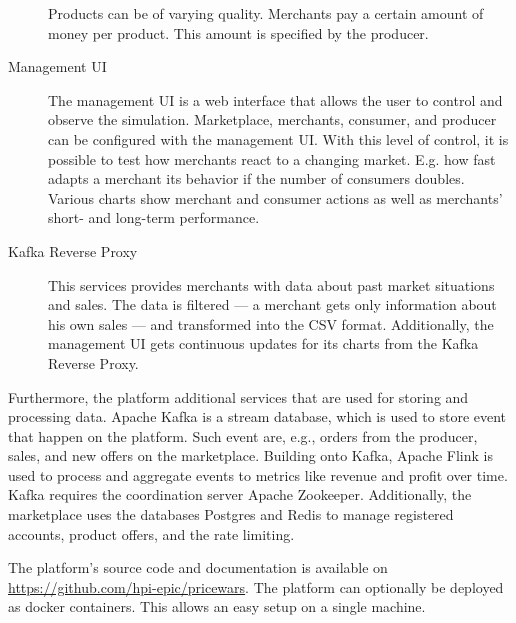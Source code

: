 \begin{description}
		Products can be of varying quality.
		Merchants pay a certain amount of money per product.
		This amount is specified by the producer.
	\item [Management UI]
		The management UI is a web interface that allows the user to control and observe the simulation.
		Marketplace, merchants, consumer, and producer can be configured with the management UI.
		With this level of control, it is possible to test how merchants react to a changing market. E.g. how fast adapts a merchant its behavior if the number of consumers doubles.
		Various charts show merchant and consumer actions as well as merchants' short- and long-term performance.
	\item [Kafka Reverse Proxy]
		This services provides merchants with data about past market situations and sales.
		The data is filtered --- a merchant gets only information about his own sales --- and transformed into the CSV format.
		Additionally, the management UI gets continuous updates for its charts from the Kafka Reverse Proxy.
		
\end{description}

Furthermore, the \pricewars platform additional services that are used for storing and processing data.
Apache Kafka is a stream database, which is used to store event that happen on the platform. Such event are, e.g., orders from the producer, sales, and new offers on the marketplace.
Building onto Kafka, Apache Flink is used to process and aggregate events to metrics like revenue and profit over time.
Kafka requires the coordination server Apache Zookeeper.
Additionally, the marketplace uses the databases Postgres and Redis to manage registered accounts, product offers, and the rate limiting.

The platform's source code and documentation is available on \url{https://github.com/hpi-epic/pricewars}.
The \pricewars platform can optionally be deployed as docker containers.
This allows an easy setup on a single machine.

